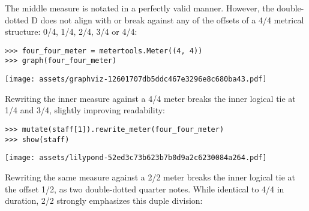 \noindent The middle measure is notated in a perfectly valid manner. However,
the double-dotted D does not align with or break against any of the offsets of
a 4/4 metrical structure: 0/4, 1/4, 2/4, 3/4 or 4/4:

\begin{comment}
<abjad>
four_four_meter = metertools.Meter((4, 4))
graph(four_four_meter)
</abjad>
\end{comment}

\begin{abjadbookoutput}
\begin{singlespacing}
\vspace{-0.5\baselineskip}
\begin{lstlisting}
>>> four_four_meter = metertools.Meter((4, 4))
>>> graph(four_four_meter)
\end{lstlisting}
\noindent\texttt{[image: assets/graphviz-12601707db5ddc467e3296e8c680ba43.pdf]}
\end{singlespacing}
\end{abjadbookoutput}

\noindent Rewriting the inner measure against a 4/4 meter breaks the inner
logical tie at 1/4 and 3/4, slightly improving readability:

\begin{comment}
<abjad>
mutate(staff[1]).rewrite_meter(four_four_meter)
show(staff)
</abjad>
\end{comment}

\begin{abjadbookoutput}
\begin{singlespacing}
\vspace{-0.5\baselineskip}
\begin{lstlisting}
>>> mutate(staff[1]).rewrite_meter(four_four_meter)
>>> show(staff)
\end{lstlisting}
\noindent\texttt{[image: assets/lilypond-52ed3c73b623b7b0d9a2c6230084a264.pdf]}
\end{singlespacing}
\end{abjadbookoutput}

\noindent Rewriting the same measure against a 2/2 meter breaks the inner
logical tie at the offset 1/2, as two double-dotted quarter notes. While
identical to 4/4 in duration, 2/2 strongly emphasizes this duple division:

\begin{comment}
<abjad>
two_two_meter = metertools.Meter((2, 2))
staff = Staff(parseable)
mutate(staff[1]).rewrite_meter(two_two_meter)
show(staff)
</abjad>
\end{comment}

